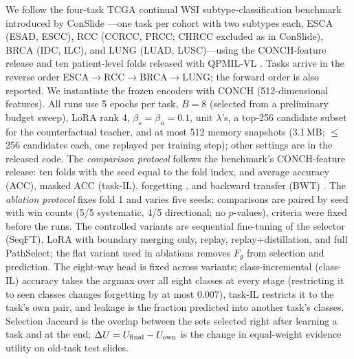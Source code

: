 \documentclass{article}
\newcommand{\Fg}{F_g}
\begin{document}
We follow the four-task TCGA continual WSI subtype-classification benchmark introduced by ConSlide \cite{huang2023conslide}---one task per cohort with two subtypes each, ESCA (ESAD, ESCC), RCC (CCRCC, PRCC; CHRCC excluded as in ConSlide), BRCA (IDC, ILC), and LUNG (LUAD, LUSC)---using the CONCH-feature release and ten patient-level folds released with QPMIL-VL \cite{gou2025qpmil}. Tasks arrive in the reverse order ESCA$\rightarrow$RCC$\rightarrow$BRCA$\rightarrow$LUNG; the forward order is also reported. We instantiate the frozen encoders with CONCH \cite{lu2024conch} (512-dimensional features). All runs use 5 epochs per task, $B=8$ (selected from a preliminary budget sweep), LoRA rank 4, $\beta_s{=}\beta_u{=}0.1$, unit $\lambda$'s, a top-256 candidate subset for the counterfactual teacher, and at most 512 memory snapshots (3.1\,MB; $\le$256 candidates each, one replayed per training step); other settings are in the released code. The \emph{comparison protocol} follows the benchmark's CONCH-feature release: ten folds with the seed equal to the fold index, and average accuracy (ACC), masked ACC (task-IL), forgetting \cite{chaudhry2018rwalk}, and backward transfer (BWT) \cite{lopezpaz2017gem}. The \emph{ablation protocol} fixes fold 1 and varies five seeds; comparisons are paired by seed with win counts (5/5 systematic, 4/5 directional; no $p$-values), criteria were fixed before the runs. The controlled variants are sequential fine-tuning of the selector (SeqFT), LoRA with boundary merging only, replay, replay+distillation, and full PathSelect; the flat variant used in ablations removes $\Fg$ from selection and prediction. The eight-way head is fixed across variants; class-incremental (class-IL) accuracy takes the argmax over all eight classes at every stage (restricting it to seen classes changes forgetting by at most $0.007$), task-IL restricts it to the task's own pair, and leakage is the fraction predicted into another task's classes. Selection Jaccard is the overlap between the sets selected right after learning a task and at the end; $\Delta U=U_{\rm final}-U_{\rm own}$ is the change in equal-weight evidence utility on old-task test slides.
\end{document}
